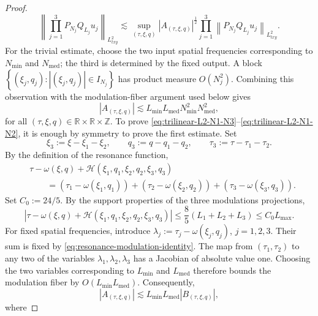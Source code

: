 \documentclass[12pt,oneside,reqno]{amsart}
\numberwithin{equation}{section}
\theoremstyle{plain}
\def\R{{\mathbb R}}
\def\Z{{\mathbb Z}}
\newcommand{\abs}[1]{%
    \left|#1\right|%
}
\newcommand{\brs}[1]{%
    \left\{#1\right\}
}
\newcommand{\Lptxy}[3]{%
    \left\lVert #1\right\rVert_{L^{#2}_{#3}}%
}
\newcommand{\rrz}{\R\times\R\times\Z}
\newcommand{\PQ}[2]{%
    P_{N_{#2}}Q_{L_{#2}}#1_{#2}%
}
\begin{document}
\begin{proof}
\begin{equation}
    \label{TheNon-TrivialEstimate-WRT-A}
\Lptxy{\prod_{j=1}^3  \PQ{u}{j}}{2}{t x y}\lesssim  \sup_{(\tau,\xi,q)}\abs{A_{(\tau,\xi,q)}}^\frac{1}{2} \prod_{j=1}^3 \Lptxy{\PQ{u}{j}}{2}{t x y}.
\end{equation}
For the trivial estimate, choose the two input spatial frequencies
corresponding to $N_{\min}$ and $N_{\mathrm{med}}$; the third is determined by the
fixed output. A block
$\brs{(\xi_j,q_j):\abs{(\xi_j,q_j)}\in I_{N_j}}$ has product measure
$O(N_j^2)$. Combining this observation with the modulation-fiber argument
used below gives
\begin{equation}
\label{TheTrivialMeasureEstimate}
    \abs{A_{(\tau,\xi,q)}}
    \lesssim
    L_{\min}L_{\mathrm{med}}N_{\min}^2N_{\mathrm{med}}^2,
\end{equation}
for all $(\tau,\xi,q)\in\rrz$. To prove
\eqref{eq:trilinear-L2-N1-N3}--\eqref{eq:trilinear-L2-N1-N2},
it is enough by symmetry to prove the first estimate. Set
\begin{equation}
    \xi_3
    :=
    \xi-\xi_1-\xi_2,
    \qquad
    q_3
    :=
    q-q_1-q_2,
    \qquad
    \tau_3
    :=
    \tau-\tau_1-\tau_2.
\end{equation}
By the definition of the resonance function,
\begin{align}
&
\tau-\omega(\xi,q)
+
\mathcal H(
    \xi_1,q_1,
    \xi_2,q_2,
    \xi_3,q_3
)
\nonumber\\
&\qquad
=
\left(
    \tau_1-\omega(\xi_1,q_1)
\right)
+
\left(
    \tau_2-\omega(\xi_2,q_2)
\right)
+
\left(
    \tau_3-\omega(\xi_3,q_3)
\right).
\label{eq:resonance-modulation-identity}
\end{align}
Set $C_0:=24/5$. By the support properties of the three modulations
projections,
\begin{equation}
\left|
\tau-\omega(\xi,q)
+
\mathcal H(
    \xi_1,q_1,
    \xi_2,q_2,
    \xi_3,q_3
)
\right|
\leq
\frac85(L_1+L_2+L_3)
\leq
C_0L_{\max}.
\end{equation}
For fixed spatial frequencies, introduce
$\lambda_j:=\tau_j-\omega(\xi_j,q_j)$, $j=1,2,3$. Their sum is fixed by
\eqref{eq:resonance-modulation-identity}. The map from
$(\tau_1,\tau_2)$ to any two of the variables $\lambda_1,\lambda_2,\lambda_3$
has a Jacobian of absolute value one. Choosing the two variables corresponding
to $L_{\min}$ and $L_{\mathrm{med}}$ therefore bounds the modulation fiber by
$O(L_{\min}L_{\mathrm{med}})$. Consequently,
\begin{equation}
\label{MeasureOf-A-and-B}
    \abs{A_{(\tau,\xi,q)}}
    \lesssim
    L_{\min}L_{\mathrm{med}}\abs{B_{(\tau,\xi,q)}},
\end{equation}
where


\end{proof}
\end{document}
